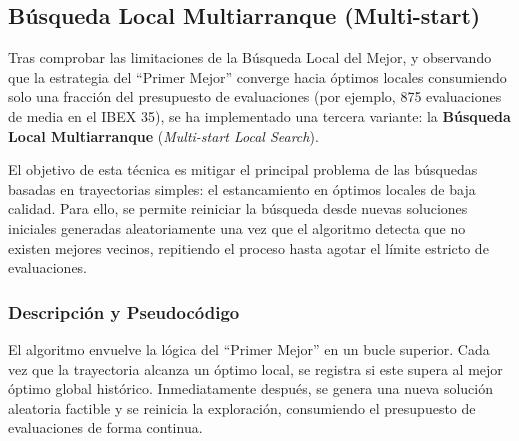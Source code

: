 \subsection{Búsqueda Local Multiarranque (Multi-start)}

Tras comprobar las limitaciones de la Búsqueda Local del Mejor, y observando que la estrategia del ``Primer Mejor'' converge hacia óptimos locales consumiendo solo una fracción del presupuesto de evaluaciones (por ejemplo, 875 evaluaciones de media en el IBEX 35), se ha implementado una tercera variante: la \textbf{Búsqueda Local Multiarranque} (\textit{Multi-start Local Search}). 

El objetivo de esta técnica es mitigar el principal problema de las búsquedas basadas en trayectorias simples: el estancamiento en óptimos locales de baja calidad. Para ello, se permite reiniciar la búsqueda desde nuevas soluciones iniciales generadas aleatoriamente una vez que el algoritmo detecta que no existen mejores vecinos, repitiendo el proceso hasta agotar el límite estricto de evaluaciones.

\subsubsection{Descripción y Pseudocódigo}
El algoritmo envuelve la lógica del ``Primer Mejor'' en un bucle superior. Cada vez que la trayectoria alcanza un óptimo local, se registra si este supera al mejor óptimo global histórico. Inmediatamente después, se genera una nueva solución aleatoria factible y se reinicia la exploración, consumiendo el presupuesto de evaluaciones de forma continua.


